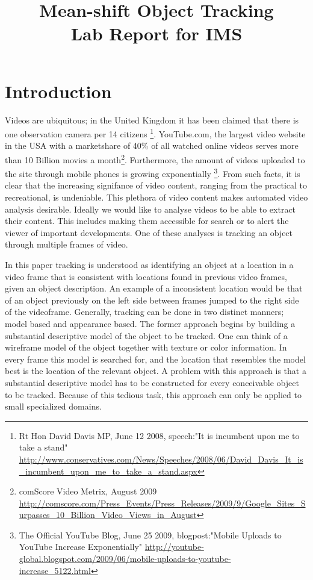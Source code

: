 \documentclass[a4paper,11pt]{article}
\title{Mean-shift Object Tracking\\ Lab Report for IMS}
\date{}
\begin{document}
\maketitle 

\section{Introduction}

	Videos are ubiquitous; in the United Kingdom it has been claimed that there is one observation camera per 14 citizens \footnote{
Rt Hon David Davis MP, June 12 2008, speech:"It is incumbent upon me to take a stand" 
\url{http://www.conservatives.com/News/Speeches/2008/06/David_Davis_It_is_incumbent_upon_me_to_take_a_stand.aspx}
}. YouTube.com, the largest video website in the USA with a marketshare of 40\% of all watched online videos serves more than 10 Billion movies a month\footnote{comScore Video Metrix, August 2009 
\url{http://comscore.com/Press_Events/Press_Releases/2009/9/Google_Sites_Surpasses_10_Billion_Video_Views_in_August}}.
	Furthermore, the amount of videos uploaded to the site through mobile phones is growing exponentially \footnote{The Official YouTube Blog, June 25 2009, blogpost:"Mobile Uploads to YouTube Increase Exponentially" 
\url{http://youtube-global.blogspot.com/2009/06/mobile-uploads-to-youtube-increase_5122.html}}. 
From such facts, it is clear that the increasing signifance of video content, ranging from the practical to recreational, is undeniable. This plethora of video content makes automated video analysis desirable. Ideally we would like to analyse videos to be able to extract their content. This includes making them accessible for search or to alert the viewer of important developments. One of these analyses is tracking an object through multiple frames of video.

In this paper tracking is understood as identifying an object at a location in a video frame that is consistent with locations found in previous video frames, given an object description. An example of a inconsistent location would be that of an object previously on the left side between frames jumped to the right side of the videoframe. Generally, tracking can be done in two distinct manners; model based and appearance based. 
The former approach begins by building a substantial descriptive model of the object to be tracked. One can think of a wireframe model of the object together with texture or color information. In every frame this model is searched for, and the location that resembles the model best is the location of the relevant object.  A problem with this approach is that a substantial descriptive model has to be constructed for every conceivable object to be tracked.  Because of this tedious task, this approach can only be applied to small specialized domains.  
\end{document}

